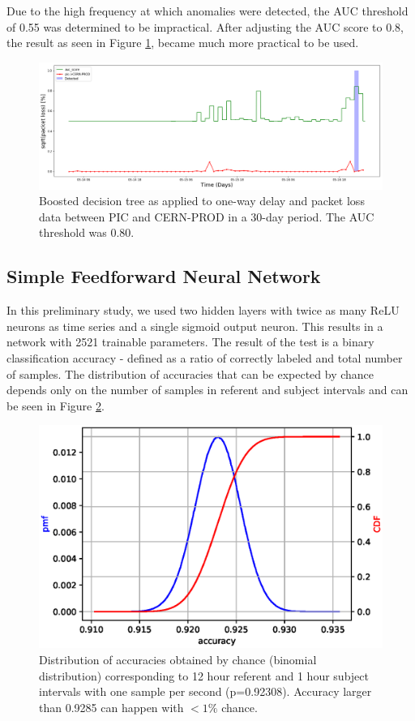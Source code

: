 \documentclass[5p]{elsarticle}
\begin{document}
Due to the high frequency at which anomalies were detected, the AUC threshold of 0.55 was determined to be impractical. After adjusting the AUC score to 0.8, the result as seen in Figure \ref{fig:BDThigh}, became much more practical to be used. 
\begin{figure}[htbp]
    \centering
    \includegraphics[width=\linewidth]{BDT_highcut.png}
    \caption{Boosted decision tree as applied to one-way delay and packet loss data between PIC and CERN-PROD in a 30-day period. The AUC threshold was 0.80.}
    \label{fig:BDThigh}
\end{figure}


\subsection{Simple Feedforward Neural Network}

In this preliminary study, we used two hidden layers with twice as many ReLU neurons as time series and a single sigmoid output neuron. This results in a network with 2521 trainable parameters.
The result of the test is a binary classification accuracy - defined as a ratio of correctly labeled and total number of samples. The distribution of accuracies that can be expected by chance depends only on the number of samples in referent and subject intervals and can be seen in Figure \ref{fig:Chance}.


\begin{figure}[htbp]
    \centering
    \includegraphics[width=\linewidth]{binomial_chance_accuracy.eps}
    \caption{Distribution of accuracies obtained by chance (binomial distribution) corresponding to 12 hour referent and 1 hour subject intervals with one sample per second (p=0.92308). Accuracy larger than 0.9285 can happen with $<1\%$ chance. }
    \label{fig:Chance}
\end{figure}
\end{document}
